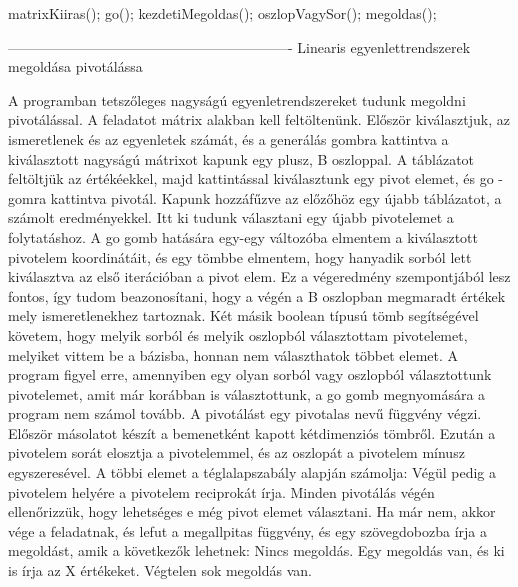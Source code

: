 matrixKiiras();
go();
kezdetiMegoldas();
oszlopVagySor();
megoldas();

-------------------------------------------------------------
Linearis egyenlettrendszerek megoldása pivotálássa


A programban tetszőleges nagyságú egyenletrendszereket tudunk megoldni pivotálással. A feladatot mátrix alakban kell feltöltenünk. Először kiválasztjuk, az ismeretlenek és az egyenletek számát, és a generálás gombra kattintva a kiválasztott nagyságú mátrixot kapunk egy plusz, B oszloppal.
A táblázatot feltöltjük az értékéekkel, majd kattintással kiválasztunk egy pivot elemet, és go -gomra kattintva pivotál. Kapunk hozzáfűzve az előzőhöz egy újabb táblázatot, a számolt eredményekkel. Itt ki tudunk választani egy újabb pivotelemet a folytatáshoz. 
A go gomb hatására egy-egy változóba elmentem a kiválasztott pivotelem koordinátáit, és egy tömbbe elmentem, hogy hanyadik sorból lett kiválasztva az első iterációban a pivot elem. Ez a végeredmény szempontjából lesz fontos, így tudom beazonosítani, hogy a végén a B oszlopban megmaradt értékek mely ismeretlenekhez tartoznak. Két másik boolean típusú tömb segítségével követem, hogy melyik sorból és melyik oszlopból választottam pivotelemet, melyiket vittem be a bázisba, honnan nem választhatok többet elemet. A program figyel erre, amennyiben egy olyan sorból vagy oszlopból választottunk pivotelemet, amit már korábban is választottunk, a go gomb megnyomására a program nem számol tovább.
A pivotálást egy pivotalas nevű függvény végzi. Először másolatot készít a bemenetként kapott kétdimenziós tömbről. Ezután a pivotelem sorát elosztja a pivotelemmel, és az oszlopát a pivotelem mínusz egyszeresével. A többi elemet a téglalapszabály alapján számolja:
Végül pedig a pivotelem helyére a pivotelem reciprokát írja.
Minden pivotálás végén ellenőrizzük, hogy lehetséges e még pivot elemet választani. Ha már nem, akkor vége a feladatnak, és lefut a megallpitas függvény, és egy szövegdobozba írja a megoldást, amik a következők lehetnek:
Nincs megoldás.
Egy megoldás van, és ki is írja az X értékeket.
Végtelen sok megoldás van. 























